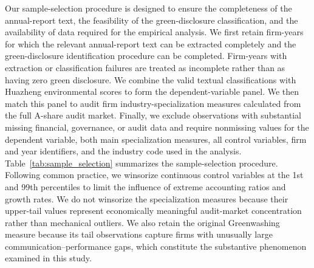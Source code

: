 \documentclass[11pt]{article}
\begin{document}
Our sample-selection procedure is designed to ensure the completeness of the annual-report text, the feasibility of the green-disclosure classification, and the availability of data required for the empirical analysis. 
We first retain firm-years for which the relevant annual-report text can be extracted completely and the green-disclosure identification procedure can be completed. 
Firm-years with extraction or classification failures are treated as incomplete rather than as having zero green disclosure. 
We combine the valid textual classifications with Huazheng environmental scores to form the dependent-variable panel. 
We then match this panel to audit firm industry-specialization measures calculated from the full A-share audit market. 
Finally, we exclude observations with substantial missing financial, governance, or audit data and require nonmissing values for the dependent variable, 
both main specialization measures, all control variables, firm and year identifiers, and the industry code used in the analysis. 
Table~\ref{tab:sample_selection} summarizes the sample-selection procedure. 
Following common practice, we winsorize continuous control variables at the 1st and 99th percentiles to limit the influence of extreme accounting ratios and growth rates. 
We do not winsorize the specialization measures because their upper-tail values represent economically meaningful audit-market concentration rather than mechanical outliers. 
We also retain the original Greenwashing measure because its tail observations capture firms with unusually large communication--performance gaps, which constitute the substantive phenomenon examined in this study.
\end{document}
